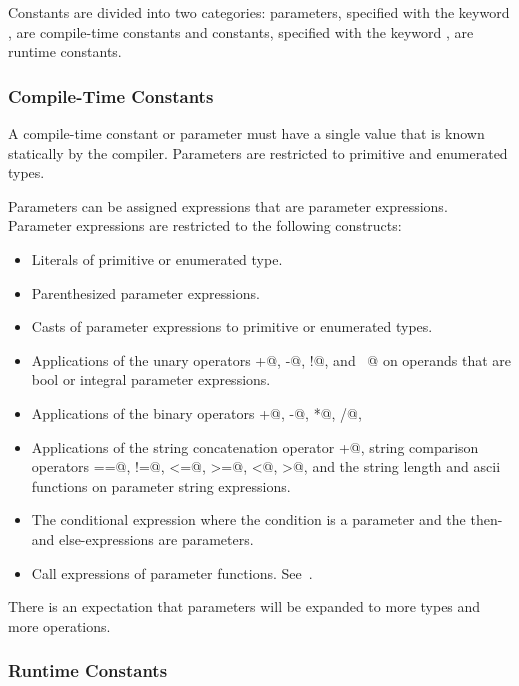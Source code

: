 Constants are divided into two categories: parameters, specified with
the keyword , are compile-time constants and constants,
specified with the keyword , are runtime constants.

\subsubsection{Compile-Time Constants}
\label{Compile-Time_Constants}

A compile-time constant or parameter must have a single value that is
known statically by the compiler.  Parameters are restricted to
primitive and enumerated types.

Parameters can be assigned expressions that are parameter expressions.
Parameter expressions are restricted to the following constructs:
\begin{itemize}
\item
 Literals of primitive or enumerated type.
\item
 Parenthesized parameter expressions.
\item
 Casts of parameter expressions to primitive or enumerated types.
\item
 Applications of the unary operators \verb@+@, \verb@-@, \verb@!@,
 and \verb@~@ on operands that are bool or integral parameter
 expressions.
\item
 Applications of the binary operators \verb@+@, \verb@-@, \verb@*@, \verb@/@, \verb@%@, \verb@**@, \verb@&&@, \verb@||@, \verb@&@, \verb@|@, \verb@^@, \verb@<<@, \verb@>>@, \verb@==@, \verb@!=@, \verb@<=@, \verb@>=@, \verb@<@, and \verb@>@ on operands that are bool or integral parameter expressions.
\item
 Applications of the string concatenation operator \verb@+@, string comparison operators \verb@==@, \verb@!=@, \verb@<=@, \verb@>=@, \verb@<@, \verb@>@, and the string length and ascii functions on parameter string expressions.
\item
 The conditional expression where the condition is a parameter and the
 then- and else-expressions are parameters.
\item
 Call expressions of parameter functions.  See~.
\end{itemize}

There is an expectation that parameters will be expanded to more types
and more operations.

\subsubsection{Runtime Constants}
\label{Runtime_Constants}

